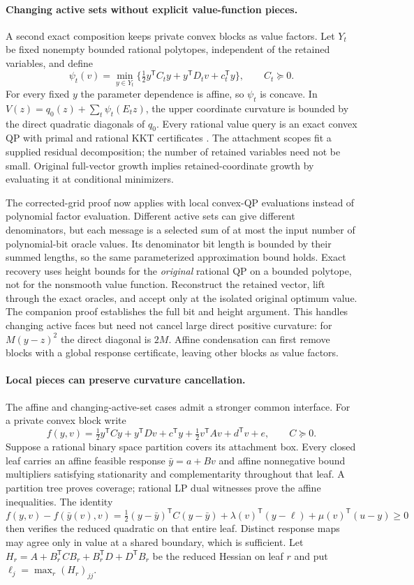 \paragraph{Changing active sets without explicit value-function pieces.}
A second exact composition keeps private convex blocks as value factors.
Let $Y_t$ be fixed nonempty bounded rational polytopes, independent of
the retained variables, and define
\[
\psi_t(v)=\min_{y\in Y_t}
\{\tfrac12y^{\mathsf T}C_ty+y^{\mathsf T}D_tv+c_t^{\mathsf T}y\},
\qquad C_t\succeq0.
\]
For every fixed $y$ the parameter dependence is affine, so $\psi_t$ is
concave. In $V(z)=q_0(z)+\sum_t\psi_t(E_tz)$, the upper coordinate
curvature is bounded by the direct quadratic diagonals of $q_0$.
Every rational value query is an exact convex QP with primal and rational
KKT certificates \cite{KozlovTarasovKhachiyan1980}. The attachment scopes
fit a supplied residual
decomposition; the number of retained variables need not be small.
Original full-vector growth implies retained-coordinate growth by
evaluating it at conditional minimizers.

The corrected-grid proof now applies with local convex-QP evaluations
instead of polynomial factor evaluation. Different active sets can give
different denominators, but each message is a selected sum of at most
the input number of polynomial-bit oracle values. Its denominator bit
length is bounded by their summed lengths, so the same parameterized
approximation bound holds. Exact recovery uses height bounds for the
\emph{original} rational QP on a bounded polytope, not for the nonsmooth
value function. Reconstruct the retained vector, lift through the exact
oracles, and accept only at the isolated original optimum value.
The companion proof establishes the full bit and height argument.
This handles changing active faces but need not cancel large direct
positive curvature: for $M(y-z)^2$ the direct diagonal is $2M$.
Affine condensation can first remove blocks with a global response
certificate, leaving other blocks as value factors.

\paragraph{Local pieces can preserve curvature cancellation.}
The affine and changing-active-set cases admit a stronger common interface.
For a private convex block write
\[
f(y,v)=\tfrac12y^{\mathsf T}Cy+y^{\mathsf T}Dv+c^{\mathsf T}y
       +\tfrac12v^{\mathsf T}Av+d^{\mathsf T}v+e,
\qquad C\succeq0.
\]
Suppose a rational binary space partition covers its attachment box.
Every closed leaf carries an affine feasible response $\bar y=a+Bv$
and affine nonnegative bound multipliers satisfying stationarity and
complementarity throughout that leaf. A partition tree proves coverage;
rational LP dual witnesses prove the affine inequalities. The identity
\[
f(y,v)-f(\bar y(v),v)
=\tfrac12(y-\bar y)^{\mathsf T}C(y-\bar y)
 +\lambda(v)^{\mathsf T}(y-\ell)+\mu(v)^{\mathsf T}(u-y)\ge0
\]
then verifies the reduced quadratic on that entire leaf. Distinct response
maps may agree only in value at a shared boundary, which is sufficient.
Let $H_r=A+B_r^{\mathsf T}CB_r+B_r^{\mathsf T}D+D^{\mathsf T}B_r$
be the reduced Hessian on leaf $r$ and put $\ell_j=\max_r(H_r)_{jj}$.

